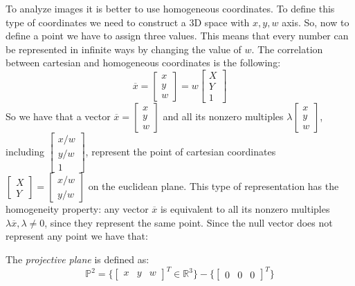 \documentclass[12pt, a4paper]{report}
\newtheorem[style=M,bodystyle=\normalfont]{theorem}{Theorem}
\newtheorem[style=M,bodystyle=\normalfont]{corollary}{Corollary}
\newtheorem[style=M,bodystyle=\normalfont]{lemma}{Lemma}
\newtheorem[style=M,bodystyle=\normalfont]{definition}{Definition}
\begin{document}
    To analyze images it is better to use homogeneous coordinates. To define this type of coordinates we need to construct a 3D space with $x,y,w$ axis. So, now to define a point
    we have to assign three values. This means that every number can be represented in infinite ways by changing the value of $w$. The correlation between cartesian
    and homogeneous coordinates is the following: 
    \[
    \overline{x} =
    \begin{bmatrix}
        x \\
        y \\
        w 
    \end{bmatrix}
    =w
    \begin{bmatrix}
        X \\
        Y \\
        1 
    \end{bmatrix}
    \]
    So we have that a vector $\overline{x} = \begin{bmatrix} x \\ y \\ w \end{bmatrix}$ and all its nonzero multiples $\lambda \begin{bmatrix} x \\ y \\ w \end{bmatrix}$, including
    $\begin{bmatrix} x/w \\ y/w \\ 1 \end{bmatrix}$, represent the point of cartesian coordinates $\begin{bmatrix} X \\ Y \end{bmatrix}=\begin{bmatrix} x/w \\ y/w\end{bmatrix}$
    on the euclidean plane. This type of representation has the homogeneity property:  any vector $\overline{x}$ is equivalent to all its nonzero multiples $\lambda \overline{x}, 
    \lambda \neq 0$, since they represent the same point. Since the null vector does not represent any point we have that: 
    \begin{definition}
        The \emph{projective plane} is defined as:
        \[\mathbb{P}^2=\{{\begin{bmatrix} x & y & w \end{bmatrix}}^T \in \mathbb{R}^3\}-\{{\begin{bmatrix} 0 & 0 & 0 \end{bmatrix}}^T\}\]
    \end{definition}
\end{document}
